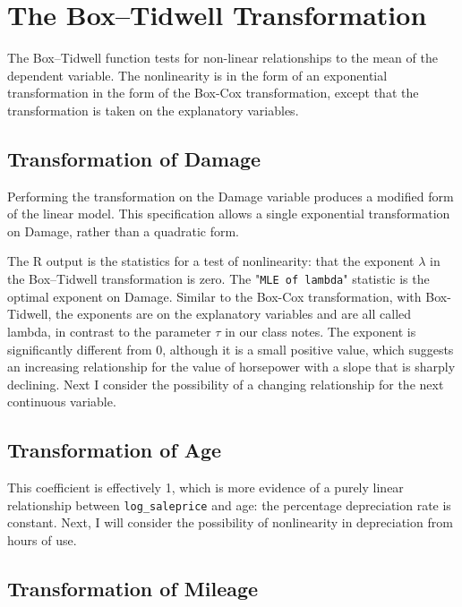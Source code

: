 \documentclass[11pt]{paper}
\begin{document}



\pagebreak
\section{The Box--Tidwell Transformation}

The Box--Tidwell function tests for non-linear relationships
to the mean of the dependent variable.
The nonlinearity is in the form of an
exponential transformation in the form of the Box-Cox
transformation, except that the transformation is taken
on the explanatory variables.


\subsection{Transformation of Damage}


Performing the transformation on the Damage variable
produces a modified form of the linear model.
This specification allows a single exponential
transformation on Damage, rather than a quadratic form.



The \textsf{R} output is the statistics for a test of nonlinearity:
that the exponent $\lambda$ in the Box--Tidwell transformation is zero.
%
The "\texttt{MLE of lambda}" statistic is the optimal exponent on Damage.
Similar to the Box-Cox transformation,
with Box-Tidwell, the exponents are on the explanatory variables
and are all called lambda, in contrast
to the parameter $\tau$ in our class notes.
The exponent is significantly different from 0,
although it is a small positive value,
which suggests an increasing relationship
for the value of horsepower
with a slope that is sharply declining.
Next I consider the possibility of a changing relationship 
for the next continuous variable. 


\subsection{Transformation of Age}




This coefficient is effectively 1, which is more evidence of
a purely linear relationship between \texttt{log\_saleprice}
and age: the percentage depreciation rate is constant.
Next, I will consider the possibility of nonlinearity 
in depreciation from hours of use. 

\subsection{Transformation of Mileage}
\end{document}
